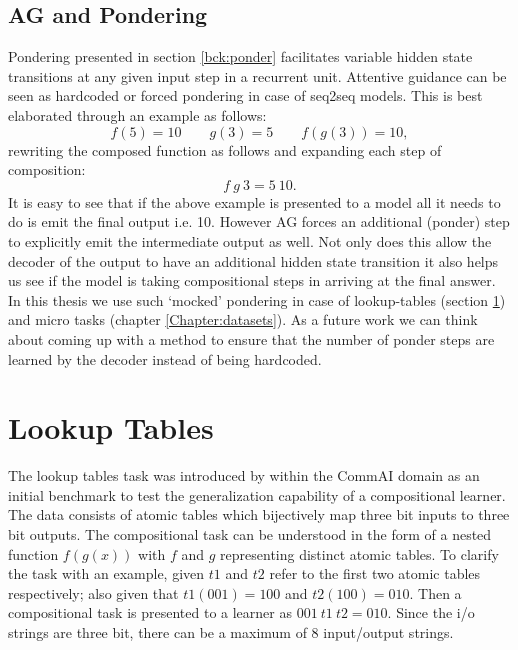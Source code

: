 \subsection{AG and Pondering} \label{pm:ag-ponder}
Pondering presented in section \ref{bck:ponder} facilitates variable hidden state transitions at any given input step in a recurrent unit. Attentive guidance can be seen as hardcoded or forced pondering in case of seq2seq models. This is best elaborated through an example as follows:
\begin{equation}
	f(5) = 10 \qquad g(3) = 5\qquad f(g(3)) = 10,
\end{equation}
rewriting the composed function as follows and expanding each step of composition:
\begin{equation}
	f\ g\ 3 = 5\ 10.
\end{equation}
It is easy to see that if the above example is presented to a model all it needs to do is emit the final output i.e. 10. However AG forces an additional (ponder) step to explicitly emit the intermediate output as well. Not only does this allow the decoder of the output to have an additional hidden state transition it also helps us see if the model is taking compositional steps in arriving at the final answer. In this thesis we use such \lq mocked\rq{} pondering in case of lookup-tables (section \ref{datasets:lt}) and micro tasks (chapter \ref{Chapter:datasets}). As a future work we can think about coming up with a method to ensure that the number of ponder steps are learned by the decoder instead of being hardcoded.

\section{Lookup Tables} \label{datasets:lt}

The lookup tables task was introduced by \cite{Liska2018} within the CommAI domain \citep{Baroni2017} as an initial benchmark to test the generalization capability of a compositional learner. The data consists of atomic tables which bijectively map three bit inputs to three bit outputs. The compositional task can be understood in the form of a nested function $f(g(x))$ with $f$ and $g$ representing distinct atomic tables. To clarify the task with an example, given $t1$ and $t2$ refer to the first two atomic tables respectively; also given that $t1(001) = 100$ and $t2(100) = 010$. Then a compositional task is presented to a learner as $001\ t1\ t2 = 010$. Since the i/o strings are three bit, there can be a maximum of 8 input/output strings.

